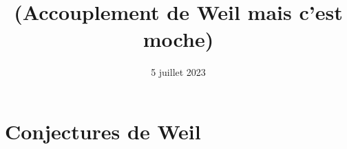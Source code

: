 \documentclass[12pt]{article}
\title{(Accouplement de Weil mais c'est moche)}
\date{5 juillet 2023}
\begin{document}
\maketitle
\section{Conjectures de Weil}
\end{document}
